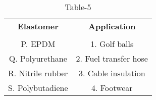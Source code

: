 \begin{table}[htbp]
  \centering
  \caption{Table-5}
  \label{table5}
  \begin{tabular}{cc}
  \textbf{Elastomer} & \textbf{Application} \\ \\
    P. EPDM & 1. Golf balls \\
    Q. Polyurethane & 2. Fuel transfer hose \\
    R. Nitrile rubber & 3. Cable insulation \\
    S. Polybutadiene & 4. Footwear \\
  \end{tabular}
\end{table}